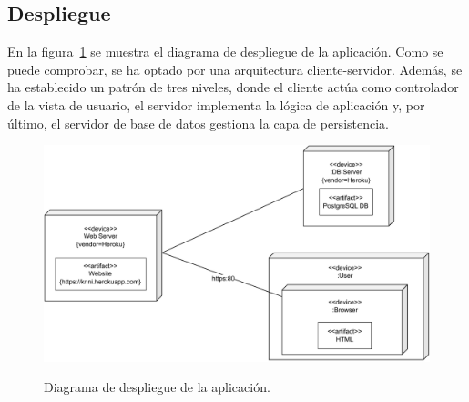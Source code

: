 \subsection{Despliegue}

En la figura~\ref{c:diagrama-deploy} se muestra el diagrama de despliegue de la aplicación. Como se puede comprobar, se ha optado por una arquitectura cliente-servidor. Además, se ha establecido un patrón de tres niveles, donde el cliente actúa como controlador de la vista de usuario, el servidor implementa la lógica de aplicación y, por último, el servidor de base de datos gestiona la capa de persistencia.

\begin{figure}[h]
	\caption[Diagrama: despliegue]{Diagrama de despliegue de la aplicación.}
	\centering
	\includegraphics[width=\textwidth]{../img/anexos/diagrams/deploy}
	\label{c:diagrama-deploy}
\end{figure}